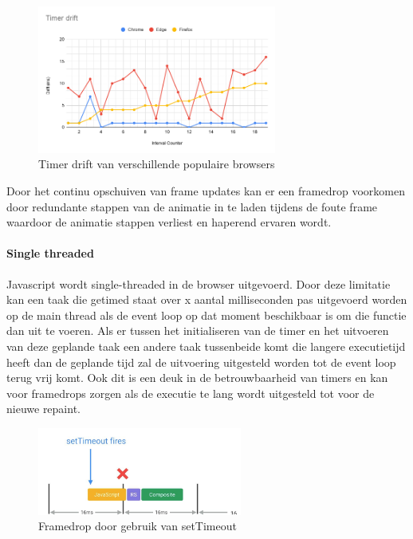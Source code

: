 \begin{figure} [H]
	\centering
	\includegraphics [width=0.7\textwidth] {img/Timer drift.png}
	\caption{Timer drift van verschillende populaire browsers} \label{drift}
\end{figure}

Door het continu opschuiven van frame updates kan er een framedrop voorkomen door redundante stappen van de animatie in te laden tijdens de foute frame waardoor de animatie stappen verliest en haperend ervaren wordt.

\paragraph{Single threaded}
Javascript wordt single-threaded in de browser uitgevoerd. Door deze limitatie kan een taak die getimed staat over x aantal milliseconden pas uitgevoerd worden op de main thread als de event loop op dat moment beschikbaar is om die functie dan uit te voeren. Als er tussen het initialiseren van de timer en het uitvoeren van deze geplande taak een andere taak tussenbeide komt die langere executietijd heeft dan de geplande tijd zal de uitvoering uitgesteld worden tot de event loop terug vrij komt. Ook dit is een deuk in de betrouwbaarheid van timers en kan voor framedrops zorgen als de executie te lang wordt uitgesteld tot voor de nieuwe repaint.

\begin{figure} [H]
	\centering
	\includegraphics [width=0.6\textwidth] {img/drift-framedrop.png}
	\caption{Framedrop door gebruik van setTimeout} \label{drift-framedrop}
\end{figure}

